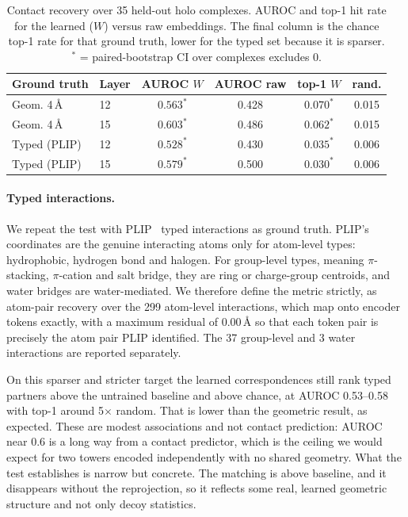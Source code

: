 \documentclass[10pt,letterpaper,twocolumn]{article}
\begin{document}
\begin{table}[t]
\centering
\footnotesize
\setlength{\tabcolsep}{2.5pt}
\caption{Contact recovery over 35 held-out holo complexes. AUROC and top-1 hit rate for the learned ($W$) versus raw embeddings. The final column is the chance top-1 rate for that ground truth, lower for the typed set because it is sparser. $^{*}$ = paired-bootstrap CI over complexes excludes 0.}
\label{tab:contacts}
\begin{tabular}{@{}llcccc@{}}
\toprule
Ground truth & Layer & AUROC $W$ & AUROC raw & top-1 $W$ & rand. \\
\midrule
Geom. 4\,\AA{} & 12 & $0.563^{*}$ & 0.428 & $0.070^{*}$ & 0.015 \\
Geom. 4\,\AA{} & 15 & $0.603^{*}$ & 0.486 & $0.062^{*}$ & 0.015 \\
Typed (PLIP) & 12 & $0.528^{*}$ & 0.430 & $0.035^{*}$ & 0.006 \\
Typed (PLIP) & 15 & $0.579^{*}$ & 0.500 & $0.030^{*}$ & 0.006 \\
\bottomrule
\end{tabular}
\end{table}

\paragraph{Typed interactions.} We repeat the test with PLIP~\cite{plip} typed interactions as ground truth. PLIP's coordinates are the genuine interacting atoms only for atom-level types: hydrophobic, hydrogen bond and halogen. For group-level types, meaning $\pi$-stacking, $\pi$-cation and salt bridge, they are ring or charge-group centroids, and water bridges are water-mediated. We therefore define the metric strictly, as atom-pair recovery over the 299 atom-level interactions, which map onto encoder tokens exactly, with a maximum residual of 0.00\,\AA{} so that each token pair is precisely the atom pair PLIP identified. The 37 group-level and 3 water interactions are reported separately.

On this sparser and stricter target the learned correspondences still rank typed partners above the untrained baseline and above chance, at AUROC 0.53--0.58 with top-1 around 5$\times$ random. That is lower than the geometric result, as expected. These are modest associations and not contact prediction: AUROC near 0.6 is a long way from a contact predictor, which is the ceiling we would expect for two towers encoded independently with no shared geometry. What the test establishes is narrow but concrete. The matching is above baseline, and it disappears without the reprojection, so it reflects some real, learned geometric structure and not only decoy statistics.
\end{document}
